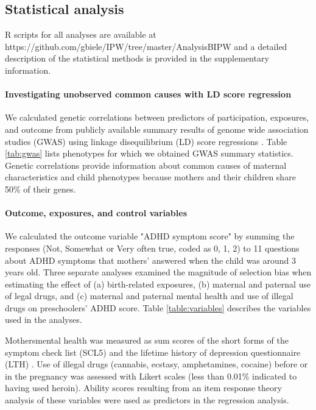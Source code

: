 \documentclass[12pt]{article}
\begin{document}
\subsection{Statistical analysis}
R scripts for all analyses are available at {\footnotesize https://github.com/gbiele/IPW/tree/master/AnalysisBIPW} and a detailed description of the statistical methods is provided in the supplementary information.

\paragraph{Investigating unobserved common causes with LD score regression} We calculated genetic correlations between predictors of participation, exposures, and outcome from publicly available summary results of genome wide association studies (GWAS) using linkage disequilibrium (LD) score regressions \cite{Bulik-Sullivan2015-er}. Table \ref{tab:gwas} lists phenotypes for which we obtained GWAS summary statistics. Genetic correlations provide information about common causes of maternal characteristics and child phenotypes because mothers and their children share 50\% of their genes.

\paragraph{Outcome, exposures, and control variables} We calculated the outcome variable "ADHD symptom score" by summing the responses (Not, Somewhat or Very often true, coded as 0, 1, 2) to 11 questions about ADHD symptoms that mothers' answered when the child was around 3 years old. Three separate analyses examined the magnitude of selection bias when estimating the effect of (a) birth-related exposures, (b) maternal and paternal use of legal drugs, and (c) maternal and paternal mental health and use of illegal drugs on preschoolers' ADHD score. Table \ref{table:variables} describes the variables used in the analyses. 

Mothers\textquotesingle \space mental health was measured as sum scores of the short forms of the symptom check list (SCL5) \cite{Tambs1993-ch} and the lifetime history of depression questionnaire (LTH) \cite{Kendler1993-pf}. Use of illegal drugs (cannabis, ecstasy, amphetamines, cocaine) before or in the pregnancy was assessed with Likert scales (less than 0.01\% indicated to having used heroin). Ability scores resulting from an item response theory analysis of these variables \cite{Rizopoulos2006-bc} were used as predictors in the regression analysis. 
\end{document}
